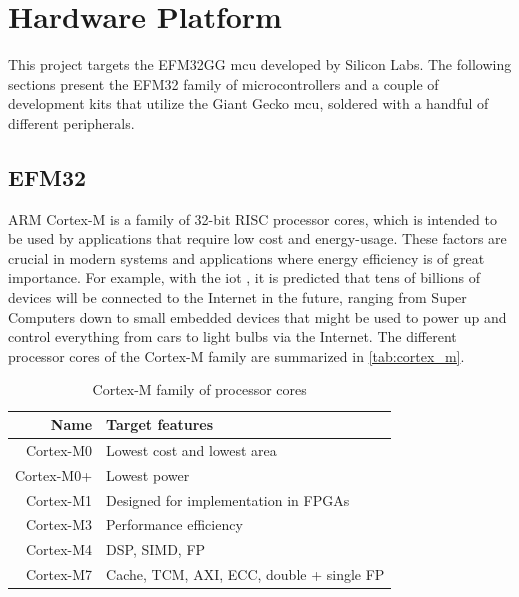 \section{Hardware Platform}
\label{sec:back:hw}

This project targets the EFM32GG \gls{mcu} developed by Silicon Labs.
The following sections present the EFM32 family of microcontrollers and a couple of development kits that utilize the Giant Gecko \gls{mcu}, soldered with a handful of different peripherals.

\subsection{EFM32}
\label{sub:emf32}

ARM Cortex-M is a family of 32-bit RISC processor cores, which is intended to be used by applications that require low cost and energy-usage.
These factors are crucial in modern systems and applications where energy efficiency is of great importance.
For example, with the \gls{iot} \cite{Valhouli2010}, it is predicted that tens of billions of devices will be connected to the Internet in the future, ranging from Super Computers down to small embedded devices that might be used to power up and control everything from cars to light bulbs via the Internet.
The different processor cores of the Cortex-M family are summarized in \autoref{tab:cortex_m}.

\begin{table}[h]
\begin{center}
\begin{tabular}{r|l}
    \textbf{Name} & \textbf{Target features}            \\
    \hline
    Cortex-M0 & Lowest cost and lowest area              \\
    Cortex-M0+ & Lowest power                            \\
    Cortex-M1 & Designed for implementation in FPGAs     \\
    Cortex-M3 & Performance efficiency                   \\
    Cortex-M4 & DSP, SIMD, FP                            \\
    Cortex-M7 & Cache, TCM, AXI, ECC, double + single FP \\
    \hline
    \end{tabular}
\end{center}
\caption{Cortex-M family of processor cores}
\label{tab:cortex_m}
\end{table}

